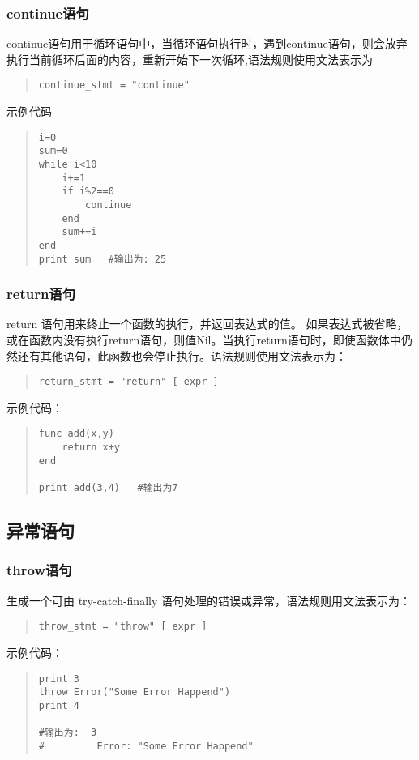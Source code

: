 \subsubsection{continue语句}
continue语句用于循环语句中，当循环语句执行时，遇到continue语句，则会放弃执行当前循环后面的内容，重新开始下一次循环,语法规则使用文法表示为
\begin{quote}
\begin{verbatim}
continue_stmt = "continue" 
\end{verbatim}
\end{quote}
示例代码
\begin{quote}
\begin{verbatim} 
i=0
sum=0
while i<10
    i+=1
    if i%2==0
        continue
    end 
    sum+=i
end 
print sum   #输出为: 25
\end{verbatim}
\end{quote}

\subsubsection{return语句}
return 语句用来终止一个函数的执行，并返回表达式的值。 如果表达式被省略，或在函数内没有执行return语句，则值Nil。当执行return语句时，即使函数体中仍然还有其他语句，此函数也会停止执行。语法规则使用文法表示为：
\begin{quote}
\begin{verbatim}
return_stmt = "return" [ expr ]
\end{verbatim}
\end{quote}
示例代码：
\begin{quote}
\begin{verbatim}
func add(x,y)
    return x+y
end 

print add(3,4)   #输出为7
\end{verbatim}
\end{quote}
\subsection{异常语句}
\subsubsection{throw语句}
生成一个可由 try-catch-finally 语句处理的错误或异常，语法规则用文法表示为：
\begin{quote}
\begin{verbatim}
throw_stmt = "throw" [ expr ]
\end{verbatim}
\end{quote}
示例代码：
\begin{quote}
\begin{verbatim}
print 3
throw Error("Some Error Happend")
print 4

#输出为:  3
#         Error: "Some Error Happend"
\end{verbatim}
\end{quote}


